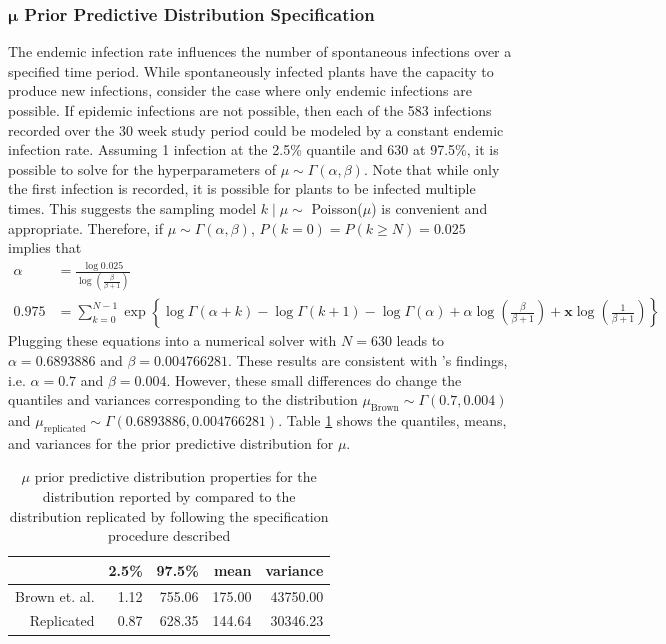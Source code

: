 \documentclass{uwstat572}
\begin{document}
\subsubsection{$\boldsymbol{\mu}$ Prior Predictive Distribution Specification}
The endemic infection rate influences the number of spontaneous infections over a specified time period. 
While spontaneously infected plants have the capacity to produce new infections, consider the case where only endemic infections are possible.
If epidemic infections are not possible, then each of the 583 infections recorded over the 30 week study period could be modeled by a constant endemic infection rate. 
Assuming 1 infection at the 2.5\% quantile and 630 at 97.5\%, it is possible to solve for the hyperparameters of $\mu \sim \Gamma(\alpha, \beta)$. 
Note that while only the first infection is recorded, it is possible for plants to be infected multiple times. 
This suggests the sampling model $k \mid \mu \sim$ Poisson($\mu$) is convenient and appropriate. 
Therefore, if $\mu \sim \Gamma(\alpha, \beta)$, $P(k=0)=P(k \ge N)=0.025$ implies that
\begin{align*}
\alpha &= \frac{\log 0.025}{\log \left( \frac{\beta}{\beta+1} \right)} \\
0.975 &= \sum_{k=0}^{N-1} \exp \left\{ \log \Gamma(\alpha+k) - \log \Gamma(k+1) - \log \Gamma(\alpha) + \alpha \log \left(\frac{\beta}{\beta +1} \right) + \boldsymbol{x} \log \left(\frac{1}{\beta +1} \right) \right\}
\end{align*}
Plugging these equations into a numerical solver with $N=630$ leads to $\alpha=0.6893886$ and $\beta=0.004766281$. 
These results are consistent with \citet{Brown}'s findings, i.e. $\alpha=0.7$ and $\beta=0.004$. 
However, these small differences do change the quantiles and variances corresponding to the distribution $\mu_{\text{Brown}} \sim \Gamma(0.7, 0.004)$ and $\mu_{\text{replicated}} \sim \Gamma(0.6893886, 0.004766281)$. 
Table \ref{table:mu_prior_quantile} shows the quantiles, means, and variances for the prior predictive distribution for $\mu$. 

\begin{table}[ht]
\centering
\begin{tabular}{rrrrr}
  \hline
 & 2.5\% & 97.5\% & mean & variance \\ 
  \hline
Brown et. al. & 1.12 & 755.06 & 175.00 & 43750.00 \\ 
  Replicated & 0.87 & 628.35 & 144.64 & 30346.23 \\ 
   \hline
\end{tabular}
\caption{$\mu$ prior predictive distribution properties for the distribution reported by \cite{Brown} compared to the distribution replicated by following the specification procedure described}
\label{table:mu_prior_quantile}
\end{table}
\end{document}

